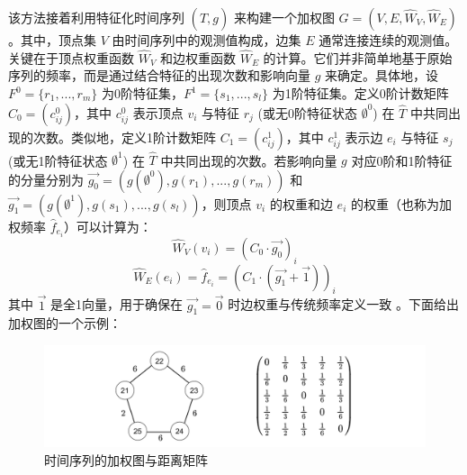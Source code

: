 该方法接着利用特征化时间序列 $(\hat{T}, g)$ 来构建一个加权图 $G=(V,E,\hat{W}_V,\hat{W}_E)$。其中，顶点集 $V$ 由时间序列中的观测值构成，边集 $E$ 通常连接连续的观测值。关键在于顶点权重函数 $\hat{W}_V$ 和边权重函数 $\hat{W}_E$ 的计算。它们并非简单地基于原始序列的频率，而是通过结合特征的出现次数和影响向量 $g$ 来确定。具体地，设 $F^0 = \{r_1, ..., r_m\}$ 为0阶特征集，$F^1 = \{s_1, ..., s_l\}$ 为1阶特征集。定义0阶计数矩阵 $C_0=(c_{ij}^0)$，其中 $c_{ij}^0$ 表示顶点 $v_i$ 与特征 $r_j$ (或无0阶特征状态 $\emptyset^0$) 在 $\hat{T}$ 中共同出现的次数。类似地，定义1阶计数矩阵 $C_1=(c_{ij}^1)$，其中 $c_{ij}^1$ 表示边 $e_i$ 与特征 $s_j$ (或无1阶特征状态 $\emptyset^1$) 在 $\hat{T}$ 中共同出现的次数。若影响向量 $g$ 对应0阶和1阶特征的分量分别为 $\vec{g_0} = (g(\emptyset^0), g(r_1), ..., g(r_m))$ 和 $\vec{g_1} = (g(\emptyset^1), g(s_1), ..., g(s_l))$，则顶点 $v_i$ 的权重和边 $e_i$ 的权重（也称为加权频率 $\hat{f}_{e_i}$）可以计算为：
\begin{equation}
    \hat{W}_V(v_i) = (C_0 \cdot \vec{g_0})_i
\end{equation}
\begin{equation}
    \hat{W}_E(e_i) = \hat{f}_{e_i} = (C_1 \cdot (\vec{g_1} + \vec{1}))_i
\end{equation}
其中 $\vec{1}$ 是全1向量，用于确保在 $\vec{g_1}=\vec{0}$ 时边权重与传统频率定义一致 。下面给出加权图的一个示例：
\begin{figure}[thbp!]
    \centering
    \includegraphics[width=1.0\textwidth]{figure/第三章加权图示意.png}
    \caption{时间序列的加权图与距离矩阵}
    \label{fig:phtsi_algorithm}
\end{figure}

